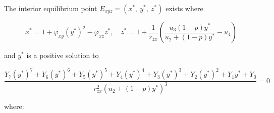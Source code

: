 \begin{theorem}\label{thm:eq-interior-exist}
    The interior equilibrium point $E_{xyz}=\left(x^*,\ y^*,\ z^*\right)$ exists where
    
    \begin{equation*}
        x^*=1+\varphi_{xy}\left(y^*\right)^2-\varphi_{xz}z^*,\quad z^*=1+\frac{1}{r_{zx}}\left(\frac{u_3\left(1-p\right)y^*}{u_2+\left(1-p\right)y^*}-u_4\right)
    \end{equation*}

    and $y^*$ is a positive solution to 

    \begin{equation*}
        \frac{Y_7\left(y^*\right)^7+Y_6\left(y^*\right)^6+Y_5\left(y^*\right)^5+Y_4\left(y^*\right)^4+Y_3\left(y^*\right)^3+Y_2\left(y^*\right)^2+Y_1y^*+Y_0}{r_{zx}^2\left(u_2+\left(1-p\right)y^*\right)^3}=0
    \end{equation*}

    where:


\end{theorem}
